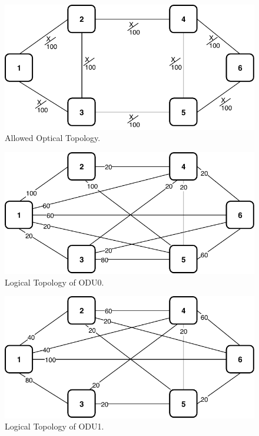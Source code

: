 \begin{figure}[h!]
\centering
\includegraphics[width=12cm]{sdf/ilp/opaque_survivability/figures/allowed_optical_topology}
\caption{Allowed Optical Topology.}
\label{allowed_optical_high}
\end{figure}

\begin{figure}[h!]
\centering
\includegraphics[width=12cm]{sdf/ilp/opaque_survivability/figures/logical_topology_ODU0_high}
\caption{Logical Topology of ODU0.}
\label{logical_ODU0_high}
\end{figure}

\begin{figure}[h!]
\centering
\includegraphics[width=12cm]{sdf/ilp/opaque_survivability/figures/logical_topology_ODU1_high}
\caption{Logical Topology of ODU1.}
\label{logical_ODU1_high}
\end{figure}

